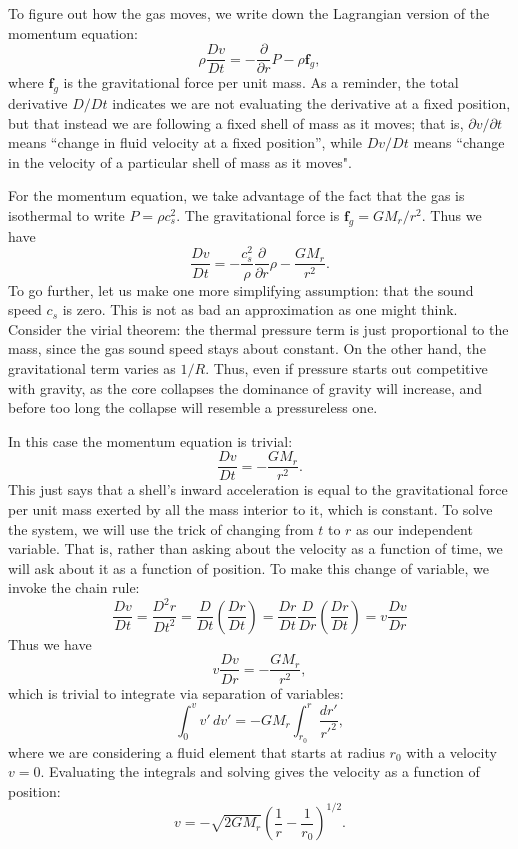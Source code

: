To figure out how the gas moves, we write down the Lagrangian version of the momentum equation:
\begin{equation}
\rho \frac{Dv}{Dt} = -\frac{\partial}{\partial r}P - \rho \mathbf{f}_g,
\end{equation}
where $\mathbf{f}_g$ is the gravitational force per unit mass. As a reminder, the total derivative $D/Dt$ indicates we are not evaluating the derivative at a fixed position, but that instead we are following a fixed shell of mass as it moves; that is, $\partial v/\partial t$ means ``change in fluid velocity at a fixed position'', while $Dv/Dt$ means ``change in the velocity of a particular shell of mass as it moves". 

For the momentum equation, we take advantage of the fact that the gas is isothermal to write $P=\rho c_s^2$. The gravitational force is $\mathbf{f}_g = G M_r / r^2$. Thus we have
\begin{equation}
\frac{Dv}{Dt}= -\frac{c_s^2}{\rho} \frac{\partial}{\partial r}{\rho} - \frac{G M_r}{r^2}.
\end{equation}
To go further, let us make one more simplifying assumption: that the sound speed $c_s$ is zero. This is not as bad an approximation as one might think. Consider the virial theorem: the thermal pressure term is just proportional to the mass, since the gas sound speed stays about constant. On the other hand, the gravitational term varies as $1/R$. Thus, even if pressure starts out competitive with gravity, as the core collapses the dominance of gravity will increase, and before too long the collapse will resemble a pressureless one.

In this case the momentum equation is trivial:
\begin{equation}
\frac{Dv}{Dt} = -\frac{GM_r}{r^2}.
\end{equation}
This just says that a shell's inward acceleration is equal to the gravitational force per unit mass exerted by all the mass interior to it, which is constant. To solve the system, we will use the trick of changing from $t$ to $r$ as our independent variable. That is, rather than asking about the velocity as a function of time, we will ask about it as a function of position. To make this change of variable, we invoke the chain rule:
\begin{equation}
\frac{Dv}{Dt} = \frac{D^2 r}{Dt^2} = \frac{D}{Dt}\left(\frac{Dr}{Dt}\right) = \frac{Dr}{Dt} \frac{D}{Dr}\left(\frac{Dr}{Dt}\right) = v \frac{Dv}{Dr}
\end{equation}
Thus we have
\begin{equation}
v\frac{Dv}{Dr} = -\frac{G M_r}{r^2},
\end{equation}
which is trivial to integrate via separation of variables:
\begin{equation}
\int_{0}^{v} v' \, dv' = -G M_r \int_{r_0}^r \frac{dr'}{r'^2},
\end{equation}
where we are considering a fluid element that starts at radius $r_0$ with a velocity $v=0$. Evaluating the integrals and solving gives the velocity as a function of position:
\begin{equation}
v = -\sqrt{2GM_r}\left(\frac{1}{r}-\frac{1}{r_0}\right)^{1/2}.
\end{equation}

